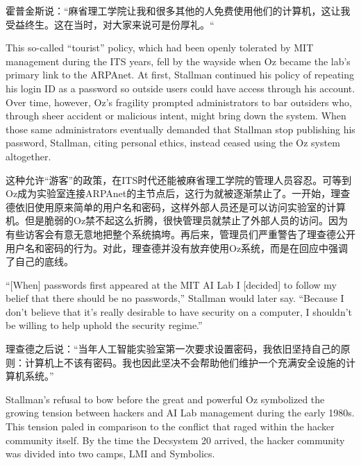 \ifdefined\chs
霍普金斯说：``麻省理工学院让我和很多其他的人免费使用他们的计算机，这让我受益终生。这在当时，对大家来说可是份厚礼。``
\fi

\ifdefined\eng
This so-called ``tourist'' policy, which had been openly tolerated by MIT management during the ITS years, fell by the wayside when Oz became the lab's primary link to the ARPAnet. At first, Stallman continued his policy of repeating his login ID as a password so outside users could have access through his account. Over time, however, Oz's fragility prompted administrators to bar outsiders who, through sheer accident or malicious intent, might bring down the system. When those same administrators eventually demanded that Stallman stop publishing his password, Stallman, citing personal ethics, instead ceased using the Oz system altogether.
\fi

\ifdefined\chs
这种允许``游客''的政策，在ITS时代还能被麻省理工学院的管理人员容忍。可等到Oz成为实验室连接ARPAnet的主节点后，这行为就被逐渐禁止了。一开始，理查德依旧使用原来简单的用户名和密码，这样外部人员还是可以访问实验室的计算机。但是脆弱的Oz禁不起这么折腾，很快管理员就禁止了外部人员的访问。因为有些访客会有意无意地把整个系统搞垮。再后来，管理员们严重警告了理查德公开用户名和密码的行为。对此，理查德并没有放弃使用Oz系统，而是在回应中强调了自己的底线。
\fi

\ifdefined\eng
``[When] passwords first appeared at the MIT AI Lab I [decided] to follow my belief that there should be no passwords,'' Stallman would later say. ``Because I don't believe that it's really desirable to have security on a computer, I shouldn't be willing to help uphold the security regime.''
\fi

\ifdefined\chs
理查德之后说：``当年人工智能实验室第一次要求设置密码，我依旧坚持自己的原则：计算机上不该有密码。我也因此坚决不会帮助他们维护一个充满安全设施的计算机系统。''
\fi

\ifdefined\eng
Stallman's refusal to bow before the great and powerful Oz symbolized the growing tension between hackers and AI Lab management during the early 1980s. This tension paled in comparison to the conflict that raged within the hacker community itself. By the time the Decsystem 20 arrived, the hacker community was divided into two camps, LMI and Symbolics.
\fi

